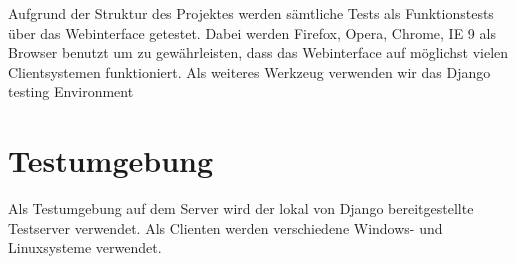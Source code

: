 
Aufgrund der Struktur des Projektes werden sämtliche Tests als Funktionstests
über das Webinterface getestet. Dabei werden Firefox, Opera, Chrome, IE 9 als
Browser benutzt um zu gewährleisten, dass das Webinterface auf möglichst vielen
Clientsystemen funktioniert. Als weiteres Werkzeug verwenden wir das Django
testing Environment

\section{Testumgebung}

Als Testumgebung auf dem Server wird der lokal von Django bereitgestellte Testserver
verwendet. Als Clienten werden verschiedene Windows- und Linuxsysteme
verwendet.
